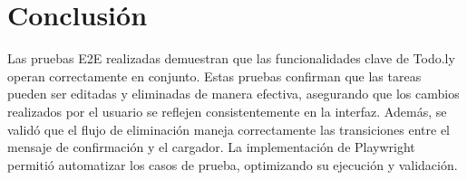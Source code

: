 \documentclass{report}
\begin{document}
\section{Conclusión}

Las pruebas E2E realizadas demuestran que las funcionalidades clave de Todo.ly operan correctamente en conjunto. Estas pruebas confirman que las tareas pueden ser editadas y eliminadas de manera efectiva, asegurando que los cambios realizados por el usuario se reflejen consistentemente en la interfaz. Además, se validó que el flujo de eliminación maneja correctamente las transiciones entre el mensaje de confirmación y el cargador. La implementación de Playwright permitió automatizar los casos de prueba, optimizando su ejecución y validación.
\end{document}
